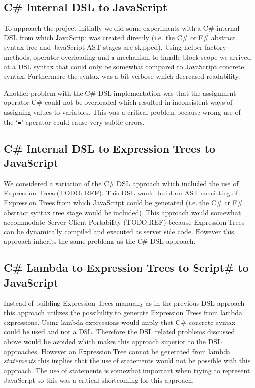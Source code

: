 	\subsection{C\# Internal DSL to JavaScript} %
	\label{ssub:c_internal_dsl_to_javascript}
		To approach the project initially we did some experiments with a C\# internal DSL from which JavaScript was created directly (i.e. the C\# or F\# abstract syntax tree and JavaScript AST stages are skipped). Using helper factory methods, operator overloading and a mechanism to handle block scope we arrived at a DSL syntax that could only be somewhat compared to JavaScript concrete syntax. Furthermore the syntax was a bit verbose which decreased readability. 

		Another problem with the C\# DSL implementation was that the assignment operator C\# could not be overloaded which resulted in inconsistent ways of assigning values to variables. This was a critical problem because wrong use of the ‘\texttt{=}’ operator could cause very subtle errors.


	\subsection{C\# Internal DSL to Expression Trees to JavaScript} %
	\label{ssub:c_internal_dsl_to_expression_trees_to_javascript}

		We considered a variation of the C\# DSL approach which included the use of Expression Trees (TODO: REF). This DSL would build an AST consisting of Expression Trees from which JavaScript could be generated (i.e. the C\# or F\# abstract syntax tree stage would be included). This approach would somewhat accommodate Server-Client Portability (TODO:REF) because Expression Trees can be dynamically compiled and executed as server side code. However this approach inherits the same problems as the C\# DSL approach.

	\subsection{C\# Lambda to Expression Trees to Script\# to JavaScript} %
	\label{ssub:c_lambda_to_expression_trees_to_script_to_javascript}
		Instead of building Expression Trees manually as in the previous DSL approach this approach utilizes the possibility to generate Expression Trees from lambda expressions. Using lambda expressions would imply that C\# concrete syntax could be used and not a DSL. Therefore the DSL related problems discussed above would be avoided which makes this approach superior to the DSL approaches. However an Expression Tree cannot be generated from lambda \emph{statements} this implies that the use of statements would not be possible with this approach. The use of statements is somewhat important when trying to represent JavaScript so this was a critical shortcoming for this approach.

